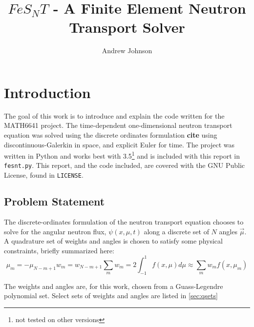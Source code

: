 \documentclass{article}
\title{$FeS_NT$ - A Finite Element Neutron Transport Solver}
\author{Andrew Johnson}
\begin{document}
\maketitle

\section{Introduction}
The goal of this work is to introduce and explain the code written for the MATH6641 project.
The time-dependent one-dimensional neutron transport equation was solved using the discrete 
ordinates formulation \textbf{cite} using discontinuous-Galerkin in space, and
explicit Euler for time.
The project was written in Python and works best with 3.5\footnote{not tested on other versions}
and is included with this report in \texttt{fesnt.py}.
This report, and the code included, are covered with the GNU Public License, found in \texttt{LICENSE}.

\subsection{Problem Statement}
The discrete-ordinates formulation of the neutron transport equation chooses to solve for the angular
neutron flux, $\psi(x, \mu, t)$ along a discrete set of $N$ angles $\vec{\mu}$. A quadrature set of 
weights and angles is chosen to satisfy some physical constraints, briefly summarized here:
\begin{subequations} \label{eq:quadRules}
    \begin{equation}
        \mu_m = -\mu_{N-m+1}
    \end{equation}
    \begin{equation}
        w_m = w_{N-m+1}
    \end{equation}
    \begin{equation}
        \sum_m w_m = 2
    \end{equation}
    \begin{equation}
        \int_{-1}^1f(x, \mu)d\mu\approx\sum_mw_m f(x, \mu_m)
    \end{equation}
\end{subequations}

The weights and angles are, for this work, chosen from a Guass-Legendre polynomial set.
Select sets of weights and angles are listed in \cref{sec:qsets}
\end{document}

